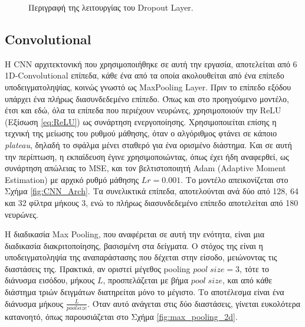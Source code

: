 \begin{figure}
{{}}
\caption{Περιγραφή της λειτουργίας του Dropout Layer.}
\label{fig:dropout_ex}
\end{figure}

\subsection{Convolutional}
Η CNN αρχιτεκτονική που χρησιμοποιήθηκε σε αυτή την εργασία, αποτελείται από 6 1D-Convolutional επίπεδα, κάθε ένα από τα οποία ακολουθείται από ένα επίπεδο υποδειγματοληψίας, κοινώς γνωστό ως MaxPooling Layer. Πριν το επίπεδο εξόδου υπάρχει ένα πλήρως διασυνδεδεμένο επίπεδο. Όπως και στο προηγούμενο μοντέλο, έτσι και εδώ, όλα τα επίπεδα που περιέχουν νευρώνες, χρησιμοποιούν την ReLU (Εξίσωση \ref{eq:ReLU}) ως συνάρτηση ενεργοποίησης. Χρησιμοποιείται επίσης η τεχνική της μείωσης του ρυθμού μάθησης, όταν ο αλγόριθμος φτάνει σε κάποιο \textit{plateau}, δηλαδή το σφάλμα μένει σταθερό για ένα ορισμένο διάστημα. Και σε αυτή την περίπτωση, η εκπαίδευση έγινε χρησιμοποιώντας, όπως έχει ήδη αναφερθεί, ως συνάρτηση απώλειας το MSE, και τον βελτιστοποιητή Adam (Adaptive Moment Estimation) με αρχικό ρυθμό μάθησης $Lr = 0.001$. Το μοντέλο απεικονίζεται στο Σχήμα \ref{fig:CNN_Arch}. Τα συνελικτικά επίπεδα, αποτελούνται ανά δύο από 128, 64 και 32 φίλτρα μήκους 3, ενώ το πλήρως διασυνδεδεμένο επίπεδο αποτελείται από 180 νευρώνες. 

Η διαδικασία Max Pooling, που αναφέρεται σε αυτή την ενότητα, είναι μια διαδικασία διακριτοποίησης, βασισμένη στα δείγματα. Ο στόχος της είναι η υποδειγματοληψία της αναπαράστασης που δέχεται στην είσοδο, μειώνοντας τις διαστάσεις της. Πρακτικά, αν οριστεί μέγεθος pooling $pool\;size = 3$, τότε το διάνυσμα εισόδου, μήκους $L$, προσπελάζεται με βήμα $pool\;size$, και από κάθε διάστημα τριών δειγμάτων διατηρείται μόνο το μέγιστο. Το αποτέλεσμα είναι ένα διάνυσμα μήκους $\frac{L}{pool size}$.  Όταν αυτό ανάγεται στις δύο διαστάσεις, γίνεται ευκολότερα κατανοητό, όπως παρουσιάζεται στο Σχήμα \ref{fig:max_pooling_2d}.

